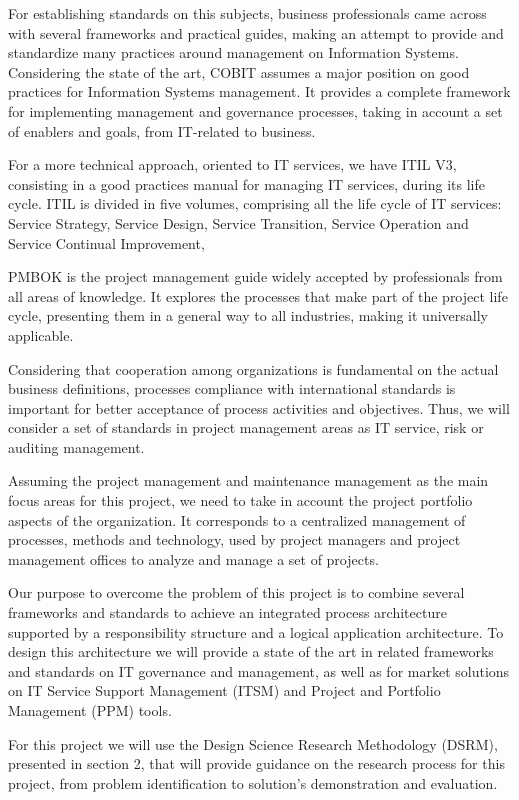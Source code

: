 For establishing standards on this subjects, business professionals came across with several frameworks and practical guides, making an attempt to provide and standardize many practices around management on Information Systems. Considering the state of the art, COBIT assumes a major position on good practices for Information Systems management. It provides a complete framework for implementing management and governance processes, taking in account a set of enablers and goals, from IT-related to business.\par
For a more technical approach, oriented to IT services, we have ITIL V3, consisting in a good practices manual for managing IT services, during its life cycle. ITIL is divided in five volumes, comprising all the life cycle of IT services: Service Strategy, Service Design, Service Transition, Service Operation and Service Continual Improvement,\par
PMBOK is the project management guide widely accepted by professionals from all areas of knowledge. It explores the processes that make part of the project life cycle, presenting them in a general way to all industries, making it universally applicable.\par
Considering that cooperation among organizations is fundamental on the actual business definitions, processes compliance with international standards is important for better acceptance of process activities and objectives. Thus, we will consider a set of standards in project management areas as IT service, risk or auditing management.\par   
Assuming the project management and maintenance management as the main focus areas for this project, we need to take in account the project portfolio aspects of the organization. It corresponds to a centralized management of processes, methods and technology, used by project managers and project management offices to analyze and manage a set of projects.\par
Our purpose to overcome the problem of this project is to combine several frameworks and standards to achieve an integrated process architecture supported by a responsibility structure and a logical application architecture. To design this architecture we will provide a state of the art in related frameworks and standards on IT governance and management, as well as for market solutions on IT Service Support Management (ITSM) and Project and Portfolio Management (PPM) tools.\par
For this project we will use the Design Science Research Methodology (DSRM)\cite{DSRM}, presented in section 2, that will provide guidance on the research process for this project, from problem identification to solution's demonstration and evaluation.\par